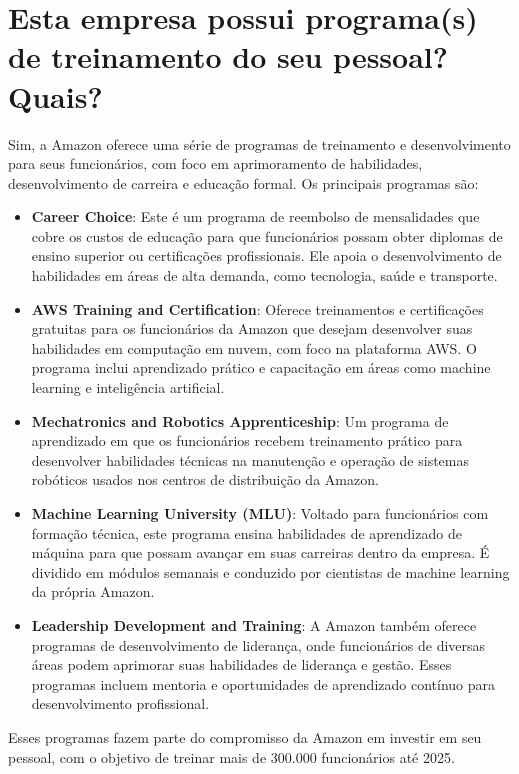 \section{Esta empresa possui programa(s) de treinamento do seu pessoal? Quais?}

Sim, a Amazon oferece uma série de programas de treinamento e desenvolvimento para seus funcionários, com foco em aprimoramento de habilidades, desenvolvimento de carreira e educação formal. Os principais programas são:

\begin{itemize}
    \item \textbf{Career Choice}: Este é um programa de reembolso de mensalidades que cobre os custos de educação para que funcionários possam obter diplomas de ensino superior ou certificações profissionais. Ele apoia o desenvolvimento de habilidades em áreas de alta demanda, como tecnologia, saúde e transporte.

    \item \textbf{AWS Training and Certification}: Oferece treinamentos e certificações gratuitas para os funcionários da Amazon que desejam desenvolver suas habilidades em computação em nuvem, com foco na plataforma AWS. O programa inclui aprendizado prático e capacitação em áreas como machine learning e inteligência artificial.

    \item \textbf{Mechatronics and Robotics Apprenticeship}: Um programa de aprendizado em que os funcionários recebem treinamento prático para desenvolver habilidades técnicas na manutenção e operação de sistemas robóticos usados nos centros de distribuição da Amazon.

    \item \textbf{Machine Learning University (MLU)}: Voltado para funcionários com formação técnica, este programa ensina habilidades de aprendizado de máquina para que possam avançar em suas carreiras dentro da empresa. É dividido em módulos semanais e conduzido por cientistas de machine learning da própria Amazon.

    \item \textbf{Leadership Development and Training}: A Amazon também oferece programas de desenvolvimento de liderança, onde funcionários de diversas áreas podem aprimorar suas habilidades de liderança e gestão. Esses programas incluem mentoria e oportunidades de aprendizado contínuo para desenvolvimento profissional.
\end{itemize}

Esses programas fazem parte do compromisso da Amazon em investir em seu pessoal, com o objetivo de treinar mais de 300.000 funcionários até 2025. \cite{amazonCareerChoice2024, amazonLeadershipTraining2024}

